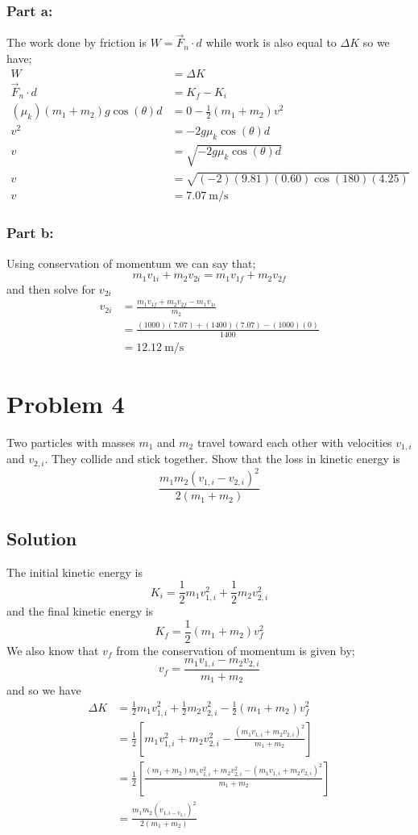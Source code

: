 \documentclass{article}
\begin{document}
\subsubsection*{Part a:}
The work done by friction is $W = \vec{F}_n \cdot d$ while work is also equal to $\Delta K$ so we have;
\begin{align*}
	W &= \Delta K \\
	\vec{F}_n \cdot d &= K_f - K_i \\
	(\mu_k)(m_1 + m_2)g \cos(\theta)d &= 0 - \frac{1}{2} (m_1 + m_2)v^2 \\
	v^2 &= -2g \mu_k \cos(\theta) d \\
	v &= \sqrt{-2g \mu_k \cos(\theta) d} \\
	v &= \sqrt{(-2)(9.81)(0.60)\cos(180)(4.25)} \\
	v &= \boxed{7.07\ \text{m}/\text{s}}
\end{align*}

\subsubsection*{Part b:}
Using conservation of momentum we can say that;
\[
	m_1 v_{1i} + m_2 v_{2i} = m_1 v_{1f} + m_2 v_{2f}
\]
and then solve for $v_{2i}$
\begin{align*}
	v_{2i} &= \frac{m_1 v_{1f} + m_2 v_{2f} - m_1 v_{1i}}{m_2} \\
	       &= \frac{(1000)(7.07) + (1400)(7.07) - (1000)(0)}{1400} \\
	       &= \boxed {12.12 \ \text{m}/\text{s}}
\end{align*}

\section*{Problem 4}
Two particles with masses $m_1$ and $m_2$ travel toward each other with velocities $v_{1,i}$ and $v_{2,i}$.
They collide and stick together. Show that the loss in kinetic energy is
\[
	\frac{m_1m_2(v_{1,i} - v_{2,i})^2}{2(m_1 + m_2)}
\]

\subsection*{Solution}
The initial kinetic energy is
\[
	K_i = \frac{1}{2}m_1v_{1,i}^2 + \frac{1}{2}m_2v_{2,i}^2
\]
and the final kinetic energy is
\[
	K_f = \frac{1}{2}(m_1 + m_2)v_f^2
\]
We also know that $v_f$ from the conservation of momentum is given by;
\[
	v_f = \frac{m_1v_{1,i}-m_2v_{2,i}}{m_1 + m_2}
\]
and so we have
\begin{align*}
	\Delta K &= \frac{1}{2} m_1 v_{1,i}^2 + \frac{1}{2} m_2 v_{2,i}^2 - \frac{1}{2} (m_1 + m_2) v_f^2 \\
		 &= \frac{1}{2} \left[ m_1 v_{1,i}^2 + m_2 v_{2,i}^2 - \frac{(m_1 v_{1,i} + m_2 v_{2,i})^2}{m_1 + m_2} \right] \\
		 &= \frac{1}{2} \left[ \frac{(m_1 + m_2) m_1 v_{1,i}^2 + m_2 v_{2,i}^2 - (m_1 v_{1,i} + m_2 v_{2,i})^2}{m_1 + m_2} \right] \\
		 &= \frac{m_1m_2(v_{1,i - v_{2,i}})^2}{2(m_1 + m_2)}
\end{align*}
\end{document}

